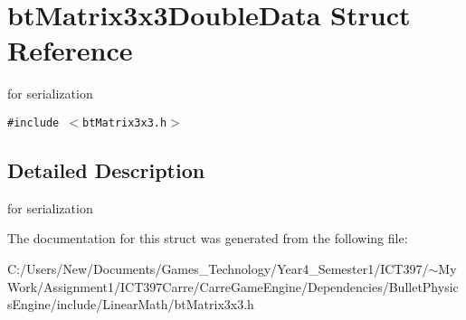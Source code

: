 \hypertarget{structbt_matrix3x3_double_data}{
\section{btMatrix3x3DoubleData Struct Reference}
\label{structbt_matrix3x3_double_data}
}
for serialization  


{\tt \#include $<$btMatrix3x3.h$>$}



\subsection{Detailed Description}
for serialization 

The documentation for this struct was generated from the following file:\begin{CompactItemize}
\item 
C:/Users/New/Documents/Games\_\-Technology/Year4\_\-Semester1/ICT397/$\sim$My Work/Assignment1/ICT397Carre/CarreGameEngine/Dependencies/BulletPhysicsEngine/include/LinearMath/btMatrix3x3.h\end{CompactItemize}
